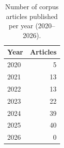 \begin{table}[htbp]
  \centering
  \caption{Number of corpus articles published per year (2020–2026).}
  \label{tab:pub_trend}
  \begin{tabular}{lr}
    \toprule
    Year & Articles \\
    \midrule
    2020 & 5 \\
    2021 & 13 \\
    2022 & 13 \\
    2023 & 22 \\
    2024 & 39 \\
    2025 & 40 \\
    2026 & 0 \\
    \bottomrule
  \end{tabular}
\end{table}